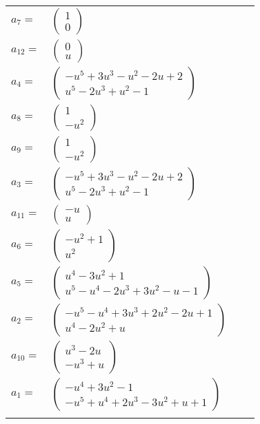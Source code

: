 \documentclass[1p]{elsarticle_modified}
\theoremstyle{definition}
\begin{document}
\begin{tabular}{m{7pt} m{180pt} m{7pt} m{180pt} }
\flushright $a_{7}=$&$\begin{pmatrix}1\\0\end{pmatrix}$ \\
\flushright $a_{12}=$&$\begin{pmatrix}0\\u\end{pmatrix}$ \\
\flushright $a_{4}=$&$\begin{pmatrix}- u^5+3 u^3- u^2-2 u+2\\u^5-2 u^3+u^2-1\end{pmatrix}$ \\
\flushright $a_{8}=$&$\begin{pmatrix}1\\- u^2\end{pmatrix}$ \\
\flushright $a_{9}=$&$\begin{pmatrix}1\\- u^2\end{pmatrix}$ \\
\flushright $a_{3}=$&$\begin{pmatrix}- u^5+3 u^3- u^2-2 u+2\\u^5-2 u^3+u^2-1\end{pmatrix}$ \\
\flushright $a_{11}=$&$\begin{pmatrix}- u\\u\end{pmatrix}$ \\
\flushright $a_{6}=$&$\begin{pmatrix}- u^2+1\\u^2\end{pmatrix}$ \\
\flushright $a_{5}=$&$\begin{pmatrix}u^4-3 u^2+1\\u^5- u^4-2 u^3+3 u^2- u-1\end{pmatrix}$ \\
\flushright $a_{2}=$&$\begin{pmatrix}- u^5- u^4+3 u^3+2 u^2-2 u+1\\u^4-2 u^2+u\end{pmatrix}$ \\
\flushright $a_{10}=$&$\begin{pmatrix}u^3-2 u\\- u^3+u\end{pmatrix}$ \\
\flushright $a_{1}=$&$\begin{pmatrix}- u^4+3 u^2-1\\- u^5+u^4+2 u^3-3 u^2+u+1\end{pmatrix}$\\&\end{tabular}
\end{document}
